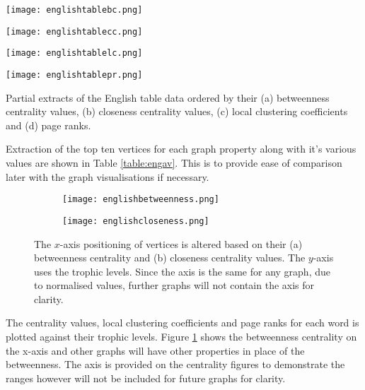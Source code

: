 \begin{table}[!htb]
\centering
\begin{subtable}{.2\textwidth}
	\centering
	\texttt{[image: englishtablebc.png]}
	\caption{}
	\label{table:englishtablebc}
\end{subtable}
\hfill
\begin{subtable}{.2\textwidth}
	\centering
	\texttt{[image: englishtablecc.png]}
	\caption{}
	\label{table:englishtablecc}
\end{subtable}
\hfill
\begin{subtable}{.2\textwidth}
	\centering
	\texttt{[image: englishtablelc.png]}
	\caption{}
	\label{table:englishtablelc}
\end{subtable}
\hfill
\begin{subtable}{.2\textwidth}
	\centering
	\texttt{[image: englishtablepr.png]}
	\caption{}
	\label{table:englishtablepr}
\end{subtable}
\caption{Partial extracts of the English table data ordered by their (a) betweenness centrality values, (b) closeness centrality values, (c) local clustering coefficients and (d) page ranks.}
\label{table:engav}
\end{table}

Extraction of the top ten vertices for each graph property along with it's various values are shown in Table \ref{table:engav}. This is to provide ease of comparison later with the graph visualisations if necessary.

\begin{figure}[!htb]
\centering
\begin{subfigure}{.45\textwidth}
	\hspace{-1.2cm} 
	\texttt{[image: englishbetweenness.png]}
	\caption{}
	\label{fig:engbc}
\end{subfigure}
\hfill
\begin{subfigure}{.45\textwidth}
	\hspace{-1cm} 
	\texttt{[image: englishcloseness.png]}
	\caption{}
	\label{fig:engcc}
\end{subfigure}
\caption{The $x$-axis positioning of vertices is altered based on their (a) betweenness centrality and (b) closeness centrality values. The $y$-axis uses the trophic levels. Since the axis is the same for any graph, due to normalised values, further graphs will not contain the axis for clarity.}
\end{figure}

The centrality values, local clustering coefficients and page ranks for each word is plotted against their trophic levels. Figure \ref{fig:engbc} shows the betweenness centrality on the x-axis and other graphs will have other properties in place of the betweenness. The axis is provided on the centrality figures to demonstrate the ranges however will not be included for future graphs for clarity.

